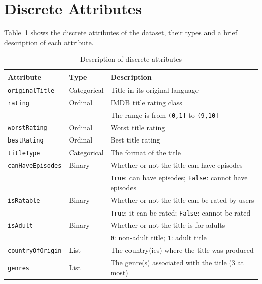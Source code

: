 \section{Discrete Attributes}
Table~\ref{tab:attributes} shows the discrete attributes of the dataset,
their types and a brief description of each attribute.
\begin{table}[h]
    \centering
    \begin{tabular}{|l|l|l|} %
        \hline
        \textbf{Attribute} & \textbf{Type} & \textbf{Description} \\ 
        \hline
        \texttt{originalTitle} & Categorical & Title in its original language \\  
        \hline
        \texttt{rating} & Ordinal & IMDB title rating class \\
        & & The range is from \texttt{(0,1]} to \texttt{(9,10]} \\ 
        \hline
        \texttt{worstRating} & Ordinal & Worst title rating \\ 
        \hline
        \texttt{bestRating} & Ordinal & Best title rating \\ 
        \hline
        \texttt{titleType} & Categorical & The format of the title \\ 
        \hline
        \texttt{canHaveEpisodes} & Binary & Whether or not the title can have episodes \\ 
        & & \texttt{True}: can have episodes; \texttt{False}: cannot have episodes \\ 
        \hline
        \texttt{isRatable} & Binary & Whether or not the title can be rated by users \\ 
        & & \texttt{True}: it can be rated; \texttt{False}: cannot be rated \\ 
        \hline
        \texttt{isAdult} & Binary & Whether or not the title is for adults \\ 
        & & \texttt{0}: non-adult title; \texttt{1}: adult title \\ 
        \hline
        \texttt{countryOfOrigin} & List & The country(ies) where the title was produced \\ 
        \hline
        \texttt{genres} & List & The genre(s) associated with the title (3 at most) \\ 
        \hline
    \end{tabular}
    \caption{Description of discrete attributes}
    \label{tab:attributes}
\end{table}

